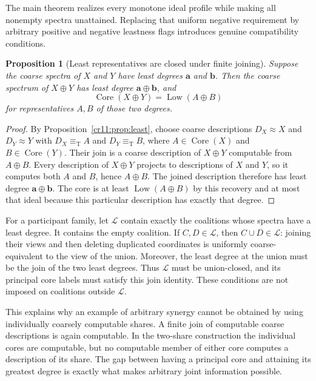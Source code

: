 \documentclass[11pt,letterpaper]{article}
\theoremstyle{plain}
\newtheorem{proposition}[theorem]{Proposition}
\theoremstyle{definition}
\theoremstyle{remark}
\numberwithin{equation}{section}
\newcommand{\eqT}{\equiv_{\mathrm T}}
\newcommand{\Core}{\operatorname{Core}}
\newcommand{\Low}{\operatorname{Low}}
\newcommand{\join}{\mathbin{\oplus}}
\begin{document}
The main theorem realizes every monotone ideal profile while making all
nonempty spectra unattained. Replacing that uniform negative requirement
by arbitrary positive and negative leastness flags introduces genuine
compatibility conditions.

\begin{proposition}[Least representatives are closed under finite joining]\label{cr11:prop:leastjoin}
Suppose the coarse spectra of $X$ and $Y$ have least degrees $\mathbf a$
and $\mathbf b$. Then the coarse spectrum of $X\join Y$ has least degree
$\mathbf a\join\mathbf b$, and
\[
            \Core(X\join Y)=\Low(A\join B)
\]
for representatives $A,B$ of those two degrees.
\end{proposition}
\begin{proof}
By Proposition~\ref{cr11:prop:least}, choose coarse descriptions $D_X\approx X$
and $D_Y\approx Y$ with $D_X\eqT A$ and $D_Y\eqT B$, where
$A\in\Core(X)$ and $B\in\Core(Y)$. Their join is a coarse description of
$X\join Y$ computable from $A\join B$.
Every description of $X\join Y$ projects to descriptions of $X$ and $Y$,
so it computes both $A$ and $B$, hence $A\join B$. The joined description
therefore has least degree $\mathbf a\join\mathbf b$.
The core is at least $\Low(A\join B)$ by this recovery and at most that
ideal because this particular description has exactly that degree.
\end{proof}

For a participant family, let $\mathcal L$ contain exactly the coalitions
whose spectra have a least degree. It contains the empty coalition. If
$C,D\in\mathcal L$, then $C\cup D\in\mathcal L$: joining their views and
then deleting duplicated coordinates is uniformly coarse-equivalent to the
view of the union. Moreover, the least degree at the union must be the join
of the two least degrees. Thus $\mathcal L$ must be union-closed, and its
principal core labels must satisfy this join identity. These conditions are
not imposed on coalitions outside $\mathcal L$.

This explains why an example of arbitrary synergy cannot be obtained by
using individually coarsely computable shares. A finite join of computable
coarse descriptions is again computable. In the two-share construction the
individual cores are computable, but no computable member of either core
computes a description of its share. The gap between having a principal
core and attaining its greatest degree is exactly what makes arbitrary
joint information possible.
\end{document}
